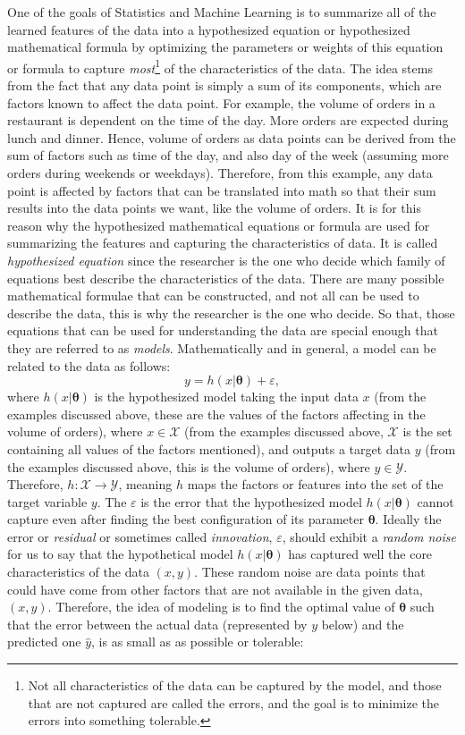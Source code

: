 One of the goals of Statistics and Machine Learning is to summarize all of the learned features of the data into a hypothesized equation or hypothesized mathematical formula by optimizing the parameters or weights of this equation or formula to capture \textit{most}\footnote{Not all characteristics of the data can be captured by the model, and those that are not captured are called the errors, and the goal is to minimize the errors into something tolerable.} of the characteristics of the data. The idea stems from the fact that any data point is simply a sum of its components, which are factors known to affect the data point. For example, the volume of orders in a restaurant is dependent on the time of the day. More orders are expected during lunch and dinner. Hence, volume of orders as data points can be derived from the sum of factors such as time of the day, and also day of the week (assuming more orders during weekends or weekdays). Therefore, from this example, any data point is affected by factors that can be translated into math so that their sum results into the data points we want, like the volume of orders. It is for this reason why the hypothesized mathematical equations or formula are used for summarizing the features and capturing the characteristics of data. It is called \textit{hypothesized equation} since the researcher is the one who decide which family of equations best describe the characteristics of the data. There are many possible mathematical formulae that can be constructed, and not all can be used to describe the data, this is why the researcher is the one who decide. So that, those equations that can be used for understanding the data are special enough that they are referred to as \textit{models}. Mathematically and in general, a model can be related to the data as follows:
\begin{equation}\label{eq:general_model}
    y=h(x|\boldsymbol{\theta})+\varepsilon,
\end{equation}
where $h(x|\boldsymbol{\theta})$ is the hypothesized model taking the input data $x$ (from the examples discussed above, these are the values of the factors affecting in the volume of orders), where $x\in\mathscr{X}$ (from the examples discussed above, $\mathscr{X}$ is the set containing all values of the factors mentioned), and outputs a target data $y$ (from the examples discussed above, this is the volume of orders), where $y\in\mathscr{Y}$. Therefore, $h:\mathscr{X}\rightarrow\mathscr{Y}$, meaning $h$ maps the factors or features into the set of the target variable $y$. The $\varepsilon$ is the error that the hypothesized model $h(x|\boldsymbol{\theta})$ cannot capture even after finding the best configuration of its parameter $\boldsymbol{\theta}$. Ideally the error or \textit{residual} or sometimes called \textit{innovation}, $\varepsilon$, should exhibit a \textit{random noise} for us to say that the hypothetical model $h(x|\boldsymbol{\theta})$ has captured well the core characteristics of the data $(x,y)$. These random noise are data points that could have come from other factors that are not available in the given data, $(x,y)$. Therefore, the idea of modeling is to find the optimal value of $\boldsymbol{\theta}$ such that the error  between the actual data (represented by $y$ below) and the predicted one $\hat{y}$, is as small as as possible or tolerable:
